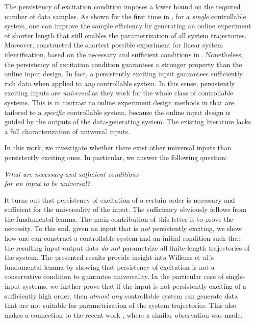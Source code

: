 \documentclass[journal,twoside,web]{ieeecolor}
\begin{document}
The persistency of excitation condition imposes a lower bound on the required number of data samples. As shown for the first time in \cite{van2021beyond}, for a \emph{single} controllable system, one can improve the sample efficiency by generating an online experiment of shorter length that still enables the parametrization of all system trajectories. Moreover, \cite{camlibel2025shortest} constructed the shortest possible experiment for linear system identification, based on the necessary and sufficient conditions in \cite{camlibel2024beyond}. Nonetheless, the persistency of excitation condition guarantees a stronger property than the online input design. In fact, a persistently exciting input guarantees sufficiently rich data when applied to \emph{any} controllable system. In this sense, persistently exciting inputs are \emph{universal} as they work for the whole class of controllable systems. This is in contrast to online experiment design methods in \cite{van2021beyond,camlibel2025shortest} that are tailored to a \emph{specific} controllable system, because the online input design is guided by the outputs of the data-generating system. The existing literature lacks a full characterization of universal inputs. %

In this work, we investigate whether there exist other universal inputs than persistently exciting ones. In particular, we answer the following question: 
\begin{center}
    \emph{What are necessary and sufficient conditions \\ for an input to be universal?}
\end{center}
It turns out that persistency of excitation of a certain order is necessary and sufficient for the universality of the input. The sufficiency obviously follows from the fundamental lemma. The main contribution of this letter is to prove the necessity. To this end, given an input that is \emph{not} persistently exciting, we show how one can construct a controllable system and an initial condition such that the resulting input-output data \emph{do not} parametrize all finite-length trajectories of the system. The presented results provide insight into Willems et al.'s fundamental lemma by showing that persistency of excitation is not a conservative condition to guarantee universality. In the particular case of single-input systems, we further prove that if the input is not persistently exciting of a sufficiently high order, then \emph{almost any} controllable system can generate data that are not suitable for parametrization of the system trajectories. This also makes a connection to the recent work \cite{markovsky2023persistency}, where a similar observation was made.
\end{document}
